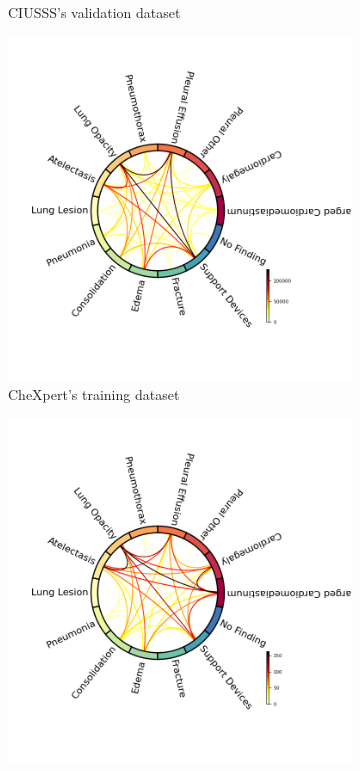 \documentclass[11pt]{article}
\begin{document}
\begin{figure}[!h]
\begin{subfigure}[b]{0.45\linewidth}
         \caption{CIUSSS's validation dataset}
         \vspace{4ex}
         \label{fig:chords_ciusss_valid}
     \end{subfigure}


     \begin{subfigure}[b]{0.45\linewidth}
         \centering
         \includegraphics[width=\linewidth]{plots/chords_chexpert_train}
         \caption{CheXpert's training dataset}
         \vspace{4ex}
         \label{fig:chords_chexpert_train}
     \end{subfigure}
     \hfill
     \begin{subfigure}[b]{0.45\linewidth}
         \centering
         \includegraphics[width=\linewidth]{plots/chords_chexpert_valid}

\end{subfigure}
\end{figure}
\end{document}
